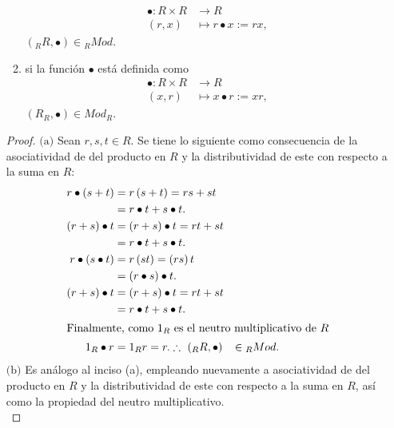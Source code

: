 \documentclass{article}
\newcommand{\lrprth}[1]{
    \left(#1\right)
}
\newcommand{\descapp}[6]{
    #1: #2 &\rightarrow #3\\
    #4 &\mapsto #5#6 
}
\theoremstyle{definition}
\theoremstyle{plain}
\theoremstyle{plain}
\theoremstyle{definition}
\theoremstyle{definition}
\theoremstyle{definition}
\theoremstyle{definition}
\theoremstyle{definition}
\theoremstyle{definition}
\begin{document}
\begin{enumerate}
\begin{enumerate}[label=(\alph*)]
        \begin{align*}
            \descapp{\bullet}{R\times R}{R}{(r,x)}{r\bullet x:=rx}{,}
        \end{align*}
        $\lrprth{{}_RR,\bullet}\in {}_RMod$.
        \item si la función $\bullet$ está definida como
        \begin{align*}
            \descapp{\bullet}{R\times R}{R}{(x,r)}{x\bullet r:=xr}{,}
        \end{align*}
        $(R_R,\bullet)\in Mod_R$.
    \end{enumerate}
    \begin{proof}
    $\boxed{\text{(a)}}$ 
    Sean $r,s,t\in R$. Se tiene lo siguiente como consecuencia de la asociatividad de del producto en $R$ y la distributividad de este con respecto a la suma en $R$:
    \begin{align*}
        r\bullet\lrprth{s+t}&=r\lrprth{s+t}=rs+st\\
        &=r\bullet t + s\bullet t.\\
        \lrprth{r+s}\bullet t&=\lrprth{r+s}\bullet t=rt+st\\
        &=r\bullet t + s\bullet t.\\
        r\bullet\lrprth{s\bullet t}&=r\lrprth{st}=\lrprth{rs}t\\
        &=\lrprth{r\bullet s}\bullet t.\\
        \lrprth{r+s}\bullet t&=\lrprth{r+s}\bullet t=rt+st\\
        &=r\bullet t + s\bullet t.\\
        \intertext{Finalmente, como $1_R$ es el neutro multiplicativo de $R$}
        1_R\bullet r&= 1_Rr=r.
        \therefore \ \lrprth{{}_RR,\bullet}&\in {}_RMod.
    \end{align*}
    $\boxed{\text{(b)}}$ Es análogo al inciso (a), empleando nuevamente a asociatividad de del producto en $R$ y la distributividad de este con respecto a la suma en $R$, así como la propiedad del neutro multiplicativo. \\
    \end{proof}
\end{enumerate}
\end{document}
